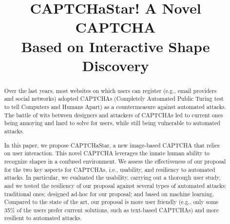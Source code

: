 \documentclass[conference]{IEEEtran}
\begin{document}
\sloppy


\title{CAPTCHaStar! A Novel CAPTCHA \\ Based on Interactive Shape Discovery}


\author{
}


\maketitle


\begin{abstract}
Over the last years, most websites on which users can register (e.g., email providers and social networks)
adopted CAPTCHAs (Completely Automated Public Turing test to tell Computers and Humans Apart) as a countermeasure against automated attacks. The battle of wits between designers and attackers of CAPTCHAs led to current ones being annoying and hard to solve for users, while still being vulnerable to automated attacks.


In this paper, we propose CAPTCHaStar, a new image-based CAPTCHA that relies on user interaction.
This novel CAPTCHA leverages the innate human ability to recognize shapes in a confused environment.
We assess the effectiveness of our proposal for the two key aspects for CAPTCHAs, i.e., usability, and resiliency to automated attacks.
In particular, we evaluated the usability, carrying out a thorough user study, and we tested the resiliency of our proposal against several types of automated attacks: traditional ones; designed ad-hoc for our proposal; and based on machine learning.
Compared to the state of the art, our proposal is more user friendly (e.g.,
only some 35\% of the users prefer current solutions, such as text-based CAPTCHAs)
and more resilient to automated attacks.
\end{abstract}
\end{document}

